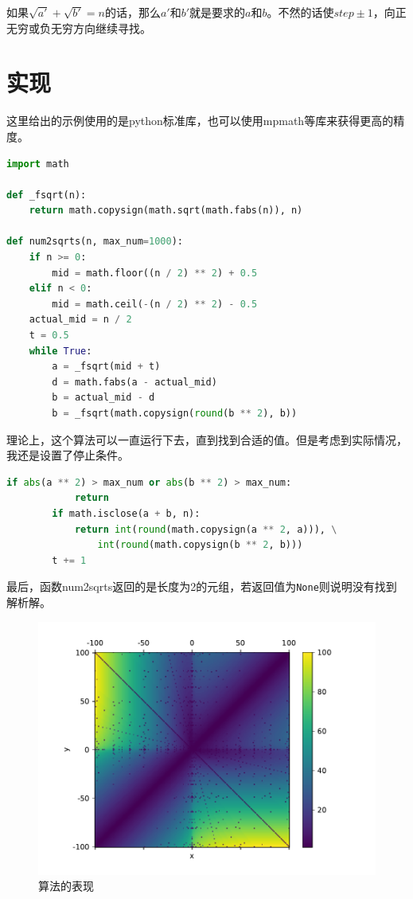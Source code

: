 \documentclass[a4paper, UTF8]{ctexart}
\begin{document}
如果$\sqrt{a'}+\sqrt{b'}=n$的话，那么$a'$和$b'$就是要求的$a$和$b$。不然的话使$step\pm1$，向正无穷或负无穷方向继续寻找。

\section{实现}
这里给出的示例使用的是python标准库，也可以使用mpmath等库来获得更高的精度。
\begin{lstlisting}[language=python, name=example]
import math

def _fsqrt(n):
    return math.copysign(math.sqrt(math.fabs(n)), n)

def num2sqrts(n, max_num=1000):
	if n >= 0:
        mid = math.floor((n / 2) ** 2) + 0.5
    elif n < 0:
        mid = math.ceil(-(n / 2) ** 2) - 0.5
    actual_mid = n / 2
    t = 0.5
    while True:
        a = _fsqrt(mid + t)
        d = math.fabs(a - actual_mid)
        b = actual_mid - d
        b = _fsqrt(math.copysign(round(b ** 2), b))
\end{lstlisting}
理论上，这个算法可以一直运行下去，直到找到合适的值。但是考虑到实际情况，我还是设置了停止条件。
\begin{lstlisting}[language=python, name=example]
        if abs(a ** 2) > max_num or abs(b ** 2) > max_num:
            return
        if math.isclose(a + b, n):
            return int(round(math.copysign(a ** 2, a))), \
                int(round(math.copysign(b ** 2, b)))
        t += 1
\end{lstlisting}
最后，函数num2sqrts返回的是长度为2的元组，若返回值为\verb|None|则说明没有找到解析解。

\begin{figure}[htb]
	\centering
	\includegraphics[width=0.8\linewidth]{perform.pdf}
	\caption{算法的表现}
	\label{fig:perform}
\end{figure}
\end{document}
